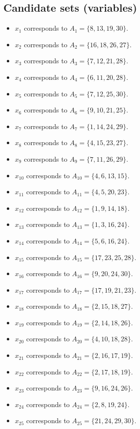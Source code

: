 \documentclass[11pt]{article}
\begin{document}
\subsection*{Candidate sets (variables)}
\begin{itemize}
\item $x_{1}$ corresponds to $A_{1}=\{8, 13, 19, 30\}$.
\item $x_{2}$ corresponds to $A_{2}=\{16, 18, 26, 27\}$.
\item $x_{3}$ corresponds to $A_{3}=\{7, 12, 21, 28\}$.
\item $x_{4}$ corresponds to $A_{4}=\{6, 11, 20, 28\}$.
\item $x_{5}$ corresponds to $A_{5}=\{7, 12, 25, 30\}$.
\item $x_{6}$ corresponds to $A_{6}=\{9, 10, 21, 25\}$.
\item $x_{7}$ corresponds to $A_{7}=\{1, 14, 24, 29\}$.
\item $x_{8}$ corresponds to $A_{8}=\{4, 15, 23, 27\}$.
\item $x_{9}$ corresponds to $A_{9}=\{7, 11, 26, 29\}$.
\item $x_{10}$ corresponds to $A_{10}=\{4, 6, 13, 15\}$.
\item $x_{11}$ corresponds to $A_{11}=\{4, 5, 20, 23\}$.
\item $x_{12}$ corresponds to $A_{12}=\{1, 9, 14, 18\}$.
\item $x_{13}$ corresponds to $A_{13}=\{1, 3, 16, 24\}$.
\item $x_{14}$ corresponds to $A_{14}=\{5, 6, 16, 24\}$.
\item $x_{15}$ corresponds to $A_{15}=\{17, 23, 25, 28\}$.
\item $x_{16}$ corresponds to $A_{16}=\{9, 20, 24, 30\}$.
\item $x_{17}$ corresponds to $A_{17}=\{17, 19, 21, 23\}$.
\item $x_{18}$ corresponds to $A_{18}=\{2, 15, 18, 27\}$.
\item $x_{19}$ corresponds to $A_{19}=\{2, 14, 18, 26\}$.
\item $x_{20}$ corresponds to $A_{20}=\{4, 10, 18, 28\}$.
\item $x_{21}$ corresponds to $A_{21}=\{2, 16, 17, 19\}$.
\item $x_{22}$ corresponds to $A_{22}=\{2, 17, 18, 19\}$.
\item $x_{23}$ corresponds to $A_{23}=\{9, 16, 24, 26\}$.
\item $x_{24}$ corresponds to $A_{24}=\{2, 8, 19, 24\}$.
\item $x_{25}$ corresponds to $A_{25}=\{21, 24, 29, 30\}$.

\end{itemize}
\end{document}
